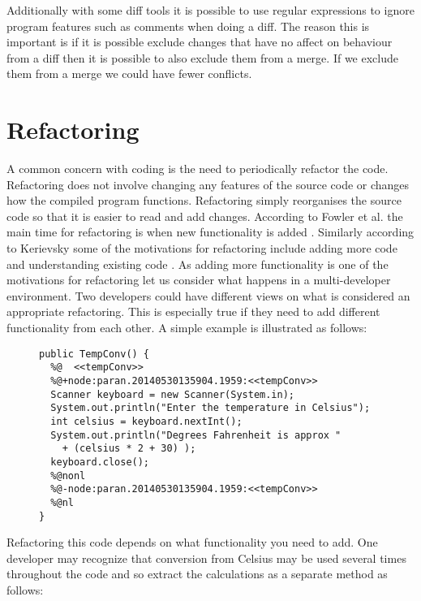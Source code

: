 Additionally with some diff tools it is possible to use regular expressions to ignore program features such as comments when doing a diff.  The reason this is important is if it is possible exclude changes that have no affect on behaviour from a diff then it is possible to also exclude them from a merge.  If we exclude them from a merge we could have fewer conflicts.

 

\section{Refactoring}

A common concern with coding is the need to periodically refactor the code. Refactoring does not involve changing any features of the source code or changes how the compiled program functions. Refactoring simply reorganises the source code so that it is easier to read and add changes. According to Fowler et al. the main time for refactoring is when new functionality is added \cite{Fowler1999}. Similarly according to Kerievsky some of the motivations for refactoring include adding more code and understanding existing code \cite{Kerievsky2004}. As adding more functionality is one of the motivations for refactoring let us consider what happens in a multi-developer environment. Two developers could have different views on what is considered an appropriate refactoring. This is especially true if they need to add different functionality from each other. 
A simple example is illustrated as follows:

\begin{figure}[!t]
\begin{lstlisting}
public TempConv() {
  %@  <<tempConv>>
  %@+node:paran.20140530135904.1959:<<tempConv>>
  Scanner keyboard = new Scanner(System.in);
  System.out.println("Enter the temperature in Celsius");
  int celsius = keyboard.nextInt();
  System.out.println("Degrees Fahrenheit is approx " 
    + (celsius * 2 + 30) );
  keyboard.close();
  %@nonl
  %@-node:paran.20140530135904.1959:<<tempConv>>
  %@nl
}
\end{lstlisting}
\end{figure}

Refactoring this code depends on what functionality you need to add. One developer may recognize that conversion from Celsius may be used several times throughout the code and so extract the calculations as a separate method as follows:

